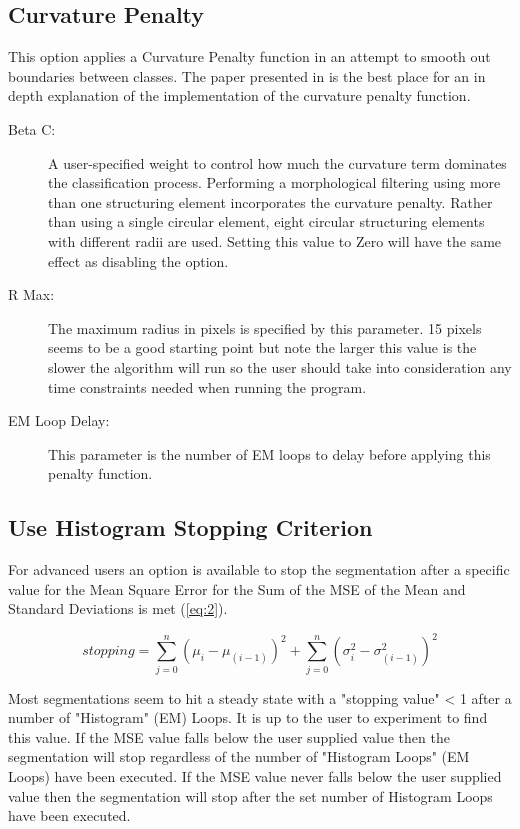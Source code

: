 \documentclass[12pt,oneside]{book}
\begin{document}
\subsection{Curvature Penalty}
This option applies a Curvature Penalty function in an attempt to smooth out boundaries between classes. The paper presented in \cite{4} is the best place for an in depth explanation of the implementation of the curvature penalty function.
\begin{description}
	\item[Beta C:]  A user-specified weight to control how much the curvature term dominates the classification process. Performing a morphological filtering using more than one structuring element incorporates the curvature penalty. Rather than using a single circular element, eight circular structuring elements with different radii are used. Setting this value to Zero will have the same effect as disabling the option. 
	\item[R Max:]  The maximum radius in pixels is specified by this parameter. 15 pixels seems to be a good starting point but note the larger this value is the slower the algorithm will run so the user should take into consideration any time constraints needed when running the program. 
	\item[EM Loop Delay:] This parameter is the number of EM loops to delay before applying this penalty function.
\end{description}

\subsection{Use Histogram Stopping Criterion}
For advanced users an option is available to stop the segmentation after a specific value for the Mean Square Error for the Sum of the MSE of the Mean and Standard Deviations is met (\ref{eq:2}).

\begin{equation}
\label{eq:2}
stopping = \sum_{j=0}^n(\mu_i - \mu_{(i-1)})^2 + \sum_{j=0}^n(\sigma_i^{2} - \sigma_{(i-1)}^{2})^2
\end{equation}

Most segmentations seem to hit a steady state with a "stopping value" < 1 after a number of "Histogram" (EM) Loops. It is up to the user to experiment to find this value. If the MSE value falls below the user supplied value then the segmentation will stop regardless of the number of "Histogram Loops" (EM Loops) have been executed. If the MSE value never falls below the user supplied value then the segmentation will stop after the set number of Histogram Loops have been executed.
\end{document}
